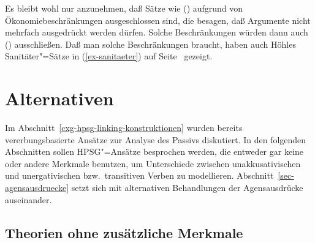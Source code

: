 {Es bleibt wohl nur anzunehmen, daß Sätze wie () aufgrund von Ökonomiebeschränkungen
ausgeschlossen sind, die besagen, daß Argumente nicht mehrfach ausgedrückt werden dürfen.
Solche Beschränkungen würden dann auch () ausschließen. Daß man solche Beschränkungen
braucht, haben auch Höhles Sanitäter"=Sätze in (\ref{ex-sanitaeter}) auf Seite~\pageref{ex-sanitaeter} gezeigt.






\section{Alternativen}

Im Abschnitt~\ref{cxg-hpsg-linking-konstruktionen} wurden bereits vererbungsbasierte Ansätze zur
Analyse des Passivs diskutiert. In den folgenden Abschnitten sollen HPSG"=Ansätze besprochen werden,
die entweder gar keine oder andere Merkmale benutzen, um Unterschiede zwischen unakkusativischen und
unergativischen bzw.\ transitiven Verben zu modellieren. Abschnitt~\ref{sec-agensausdruecke} setzt
sich mit alternativen Behandlungen der Agensausdrücke auseinander.

\subsection{Theorien ohne zusätzliche Merkmale}



}
